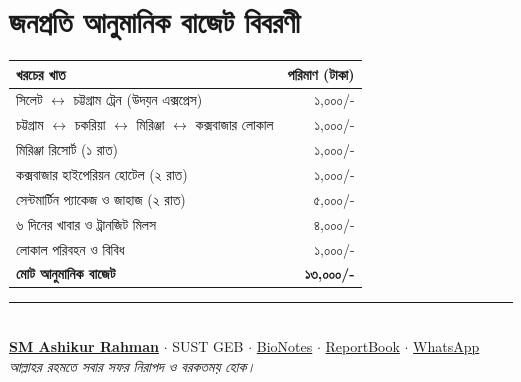 \documentclass[11pt]{article}
\begin{document}
\section*{জনপ্রতি আনুমানিক বাজেট বিবরণী}
\begin{center}
\small
\begin{tabular}{|l|r|}
\hline
\textbf{খরচের খাত} & \textbf{পরিমাণ (টাকা)} \\
\hline
সিলেট $\leftrightarrow$ চট্টগ্রাম ট্রেন (উদয়ন এক্সপ্রেস) & ১,০০০/- \\
চট্টগ্রাম $\leftrightarrow$ চকরিয়া $\leftrightarrow$ মিরিঞ্জা $\leftrightarrow$ কক্সবাজার লোকাল & ১,০০০/- \\
মিরিঞ্জা রিসোর্ট (১ রাত) & ১,০০০/- \\
কক্সবাজার হাইপেরিয়ন হোটেল (২ রাত) & ১,০০০/- \\
সেন্টমার্টিন প্যাকেজ ও জাহাজ (২ রাত) & ৫,০০০/- \\
৬ দিনের খাবার ও ট্রানজিট মিলস & ৪,০০০/- \\
লোকাল পরিবহন ও বিবিধ & ১,০০০/- \\
\hline
\textbf{মোট আনুমানিক বাজেট} & \textbf{~১৩,০০০/-} \\
\hline
\end{tabular}
\end{center}

\vspace{2mm}
\begin{center}
\rule{0.7\textwidth}{0.4pt}\\[1.2mm]
{\footnotesize \textbf{\href{https://ashiq-sm.github.io/portfolio}{SM Ashikur Rahman}} $\cdot$ SUST GEB $\cdot$ \href{https://sm-nextgen-bionotes.vercel.app/}{BioNotes} $\cdot$ \href{https://report-book-app.pages.dev/#}{ReportBook} $\cdot$ \href{https://wa.me/+8801773971905}{WhatsApp}}\\[1mm]
{\scriptsize \color{gray} \textit{আল্লাহর রহমতে সবার সফর নিরাপদ ও বরকতময় হোক।}}
\end{center}
\end{document}
